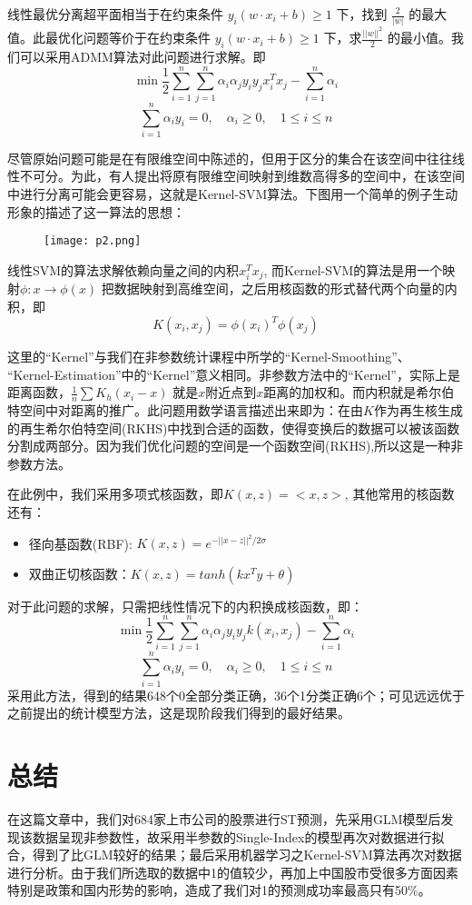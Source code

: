 \documentclass[a4paper,UTF8]{article}
\begin{document}
线性最优分离超平面相当于在约束条件 $y_{i}(w\cdot x_{i}+b) \geq 1$ 下，找到 $\frac{2}{|w|}$ 的最大值。此最优化问题等价于在约束条件 $y_{i}(w\cdot x_{i}+b) \geq 1$ 下，求$ \frac{||w ||^{2}}{2}$	的最小值。我们可以采用ADMM算法对此问题进行求解。即
$$\min \frac{1}{2}  \sum_{i=1}^{n}\sum_{j=1}^{n} \alpha_{i}\alpha_{j}y_{i}y_{j}x_{i}^{T}x_{j} - \sum_{i=1}^{n}\alpha_{i}$$
$$\sum_{i=1}^{n}\alpha_{i}y_{i}=0,\quad \alpha_{i} \geq 0,\quad 1\leq i \leq n $$

尽管原始问题可能是在有限维空间中陈述的，但用于区分的集合在该空间中往往线性不可分。为此，有人提出将原有限维空间映射到维数高得多的空间中，在该空间中进行分离可能会更容易，这就是Kernel-SVM算法。下图用一个简单的例子生动形象的描述了这一算法的思想：
\begin{figure}[H]
	\centering\texttt{[image: p2.png]}
\end{figure}

线性SVM的算法求解依赖向量之间的内积$x_{i}^{T}x_{j}$, 而Kernel-SVM的算法是用一个映射$\phi:x\rightarrow\phi(x)$ 把数据映射到高维空间，之后用核函数的形式替代两个向量的内积，即
$$K(x_{i},x_{j})=\phi(x_{i})^{T}\phi(x_{j}) $$

这里的“Kernel”与我们在非参数统计课程中所学的“Kernel-Smoothing”、\\“Kernel-Estimation”中的“Kernel”意义相同。非参数方法中的“Kernel”，实际上是距离函数，$\frac{1}{n}\sum K_{h}(x_{i}-x)$ 就是$x$附近点到$x$距离的加权和。而内积就是希尔伯特空间中对距离的推广。此问题用数学语言描述出来即为：在由$K$作为再生核生成的再生希尔伯特空间(RKHS)中找到合适的函数，使得变换后的数据可以被该函数分割成两部分。因为我们优化问题的空间是一个函数空间(RKHS),所以这是一种非参数方法。

在此例中，我们采用多项式核函数，即$K(x,z)=<x,z> $, 其他常用的核函数还有：
\begin{itemize}
	\item 径向基函数(RBF): $K(x,z)=e^{-||x-z||^{2}/2\sigma} $
	\item 双曲正切核函数：$K(x,z)=tanh(kx^{T}y+\theta) $
\end{itemize}

对于此问题的求解，只需把线性情况下的内积换成核函数，即：
$$\min \frac{1}{2}  \sum_{i=1}^{n}\sum_{j=1}^{n} \alpha_{i}\alpha_{j}y_{i}y_{j}k(x_{i},x_{j}) - \sum_{i=1}^{n}\alpha_{i}$$
$$\sum_{i=1}^{n}\alpha_{i}y_{i}=0,\quad \alpha_{i} \geq 0,\quad 1\leq i \leq n $$
采用此方法，得到的结果648个0全部分类正确，36个1分类正确6个；可见远远优于之前提出的统计模型方法，这是现阶段我们得到的最好结果。


\section{总结}
在这篇文章中，我们对684家上市公司的股票进行ST预测，先采用GLM模型后发现该数据呈现非参数性，故采用半参数的Single-Index的模型再次对数据进行拟合，得到了比GLM较好的结果；最后采用机器学习之Kernel-SVM算法再次对数据进行分析。由于我们所选取的数据中1的值较少，再加上中国股市受很多方面因素特别是政策和国内形势的影响，造成了我们对1的预测成功率最高只有50\%。\\
\end{document}
